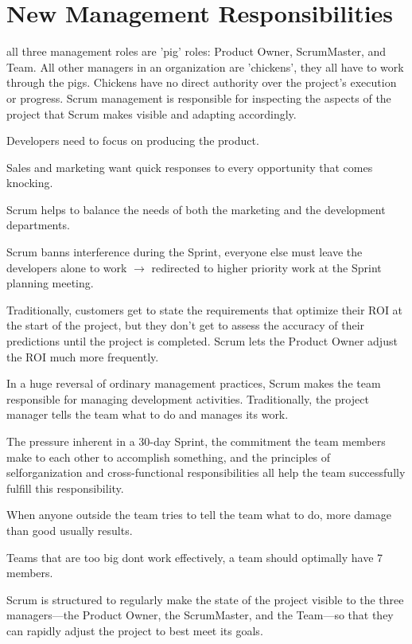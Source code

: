 \pagebreak
\chapter{New Management Responsibilities}

all three management roles are 'pig' roles: Product Owner, ScrumMaster, and Team. All other
managers in an organization are 'chickens', they all have to work through the pigs.
Chickens have no direct authority over the project’s execution or progress. Scrum management is responsible for inspecting the aspects of the project that Scrum makes visible and adapting accordingly.

Developers need to focus on producing the product. 

Sales and marketing want quick responses to every opportunity that comes knocking.

Scrum helps to balance the needs of both the marketing and the development departments.

Scrum banns interference during the Sprint, everyone else must leave the developers alone to work $\rightarrow$ redirected to higher priority work at the Sprint planning meeting.

Traditionally, customers get to state the requirements that optimize their ROI at the start of the project, but they don’t get to assess the accuracy of their predictions until the project is completed. Scrum lets the Product Owner adjust the ROI much more frequently.

In a huge reversal of ordinary management practices, Scrum makes the team responsible for managing development activities. Traditionally, the project manager tells the team what to do and manages its work.

The pressure inherent in a 30-day Sprint, the commitment the team members make to each other to accomplish something, and the principles of selforganization and cross-functional responsibilities all help the team successfully fulfill this responsibility.

When anyone outside the team tries to tell the team what to do, more damage than good usually results.

Teams that are too big dont work effectively, a team should optimally have 7 members.


Scrum is structured to regularly make the state of the project visible to the three managers—the Product Owner, the ScrumMaster, and the Team—so that they can rapidly adjust the project to best meet its goals.






